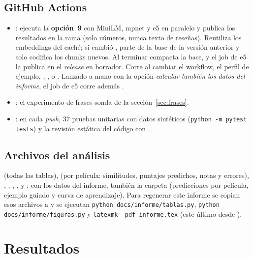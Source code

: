\documentclass[11pt,a4paper]{article}
\newcommand{\menu}[1]{\textsf{\textbf{opción~#1}}}
\begin{document}
\subsection{GitHub Actions}
\begin{itemize}
  \item {}: ejecuta la \menu{9} con MiniLM, mpnet y e5 en paralelo y publica los resultados en la
  rama  (solo números, nunca texto de reseñas). Reutiliza los embeddings del caché; si
  cambió , parte de la base de la versión anterior y solo codifica los chunks nuevos. Al terminar
  compacta la base, y el job de e5 la publica en el \emph{release} en borrador. Corre al cambiar el workflow, el perfil de
  ejemplo, , ,  o .
  Lanzado a mano con la opción \emph{calcular también los datos del informe}, el job de e5 corre además
  .
  \item {}: el experimento de frases sonda de la sección~\ref{sec:frases}.
  \item {}: en cada \emph{push}, 37 pruebas unitarias con datos sintéticos
  (\texttt{python -m pytest tests}) y la revisión estática del código con .
\end{itemize}

\subsection{Archivos del análisis}
 (todas las tablas),  (por película: similitudes, puntajes predichos, notas y
errores), , , , ,
 y ; con los datos del informe, también la carpeta 
(predicciones por película, ejemplo guiado y curva de aprendizaje). Para regenerar este informe se copian esos archivos
a  y se ejecutan \texttt{python docs/informe/tablas.py}, \texttt{python
docs/informe/figuras.py} y \texttt{latexmk -pdf informe.tex} (este último desde ).

\section{Resultados}
\end{document}
